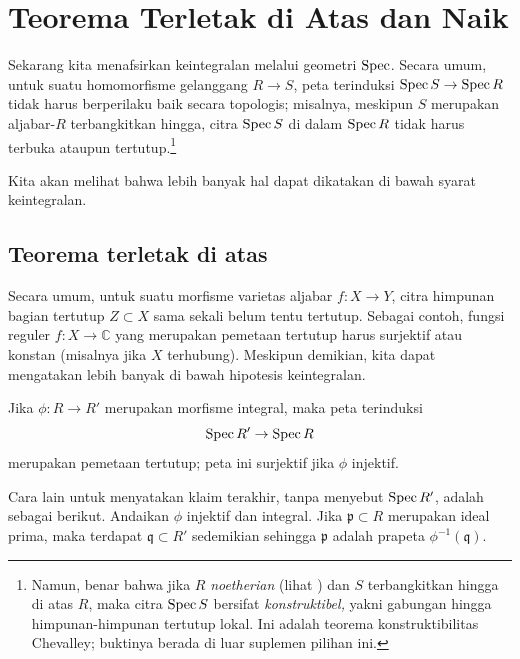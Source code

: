 \section{Teorema Terletak di Atas dan Naik}
Sekarang kita menafsirkan keintegralan melalui geometri $\operatorname{Spec}$.
Secara umum, untuk suatu homomorfisme gelanggang $R \to S$, peta terinduksi $\operatorname{Spec} S \to
\operatorname{Spec} R$ tidak harus berperilaku baik secara topologis; misalnya, meskipun $S$ merupakan
aljabar-$R$ terbangkitkan hingga, citra $\operatorname{Spec} S$ di dalam $\operatorname{Spec} R$ tidak harus
terbuka ataupun tertutup.\footnote{Namun, benar bahwa jika $R$
\emph{noetherian} (lihat ) dan $S$ terbangkitkan hingga di atas
$R$, maka citra $\operatorname{Spec} S$ bersifat \emph{konstruktibel,} yakni gabungan hingga
himpunan-himpunan tertutup lokal. Ini adalah teorema konstruktibilitas Chevalley; buktinya berada di luar suplemen pilihan ini.}

Kita akan melihat bahwa lebih banyak hal dapat dikatakan di bawah syarat keintegralan.



\subsection{Teorema terletak di atas}

Secara umum, untuk suatu morfisme varietas aljabar $f: X \to Y$, citra
himpunan bagian tertutup $Z \subset X$ sama sekali belum tentu tertutup. Sebagai contoh, fungsi reguler $f: X \to \mathbb{C}$ 
yang merupakan pemetaan tertutup harus surjektif atau konstan (misalnya jika $X$
terhubung).
Meskipun demikian, kita dapat mengatakan lebih banyak di bawah hipotesis keintegralan.

\begin{proposition} \label{lyingover}
Jika $\phi: R \to R'$ merupakan morfisme integral, maka peta terinduksi
\[  \operatorname{Spec} R' \to \operatorname{Spec} R  \]
merupakan pemetaan tertutup; peta ini surjektif jika $\phi$ injektif.
 \end{proposition}

Cara lain untuk menyatakan klaim terakhir, tanpa menyebut $\operatorname{Spec} R'$, adalah sebagai
berikut. Andaikan $\phi$ injektif dan integral. Jika
$\mathfrak{p} \subset R$ merupakan ideal prima, maka terdapat $\mathfrak{q} \subset R'$
sedemikian sehingga $\mathfrak{p}$ adalah prapeta $\phi^{-1}(\mathfrak{q})$.

